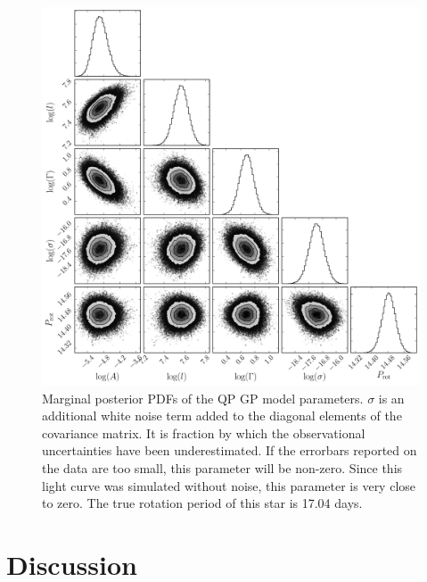 \begin{figure}
\begin{center}
\includegraphics[width=6in, clip=true]{figures/demo_triangle.pdf}
\caption{Marginal posterior PDFs of the QP GP model parameters. $\sigma$ is an
additional white noise term added to the diagonal elements of the covariance
matrix. It is fraction by which the observational uncertainties have been
underestimated. If the errorbars reported on the data are too small, this
parameter will be non-zero. Since this light curve was simulated without
noise, this parameter is very close to zero.
The true rotation period of this star is 17.04 days.}
\end{center}
\end{figure}
\label{fig:gp_posteriors}


\section{Discussion}
\label{sec:discussion}

